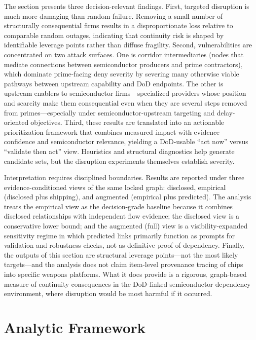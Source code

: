 The section presents three decision-relevant findings. First, targeted disruption is much more damaging than random failure. Removing a small number of structurally consequential firms results in a disproportionate loss relative to comparable random outages, indicating that continuity risk is shaped by identifiable leverage points rather than diffuse fragility. Second, vulnerabilities are concentrated on two attack surfaces. One is corridor intermediaries (nodes that mediate connections between semiconductor producers and prime contractors), which dominate prime-facing deny severity by severing many otherwise viable pathways between upstream capability and DoD endpoints. The other is upstream enablers to semiconductor firms---specialized providers whose position and scarcity make them consequential even when they are several steps removed from primes---especially under semiconductor-upstream targeting and delay-oriented objectives. Third, these results are translated into an actionable prioritization framework that combines measured impact with evidence confidence and semiconductor relevance, yielding a DoD-usable ``act now'' versus ``validate then act'' view. Heuristics and structural diagnostics help generate candidate sets, but the disruption experiments themselves establish severity.

Interpretation requires disciplined boundaries. Results are reported under three evidence-conditioned views of the same locked graph: disclosed, empirical (disclosed plus shipping), and augmented (empirical plus predicted). The analysis treats the empirical view as the decision-grade baseline because it combines disclosed relationships with independent flow evidence; the disclosed view is a conservative lower bound; and the augmented (full) view is a visibility-expanded sensitivity regime in which predicted links primarily function as prompts for validation and robustness checks, not as definitive proof of dependency. Finally, the outputs of this section are structural leverage points---not the most likely targets---and the analysis does not claim item-level provenance tracing of chips into specific weapons platforms. What it does provide is a rigorous, graph-based measure of continuity consequences in the DoD-linked semiconductor dependency environment, where disruption would be most harmful if it occurred.

\section{Analytic Framework}
\label{sec:ch4_framework}


